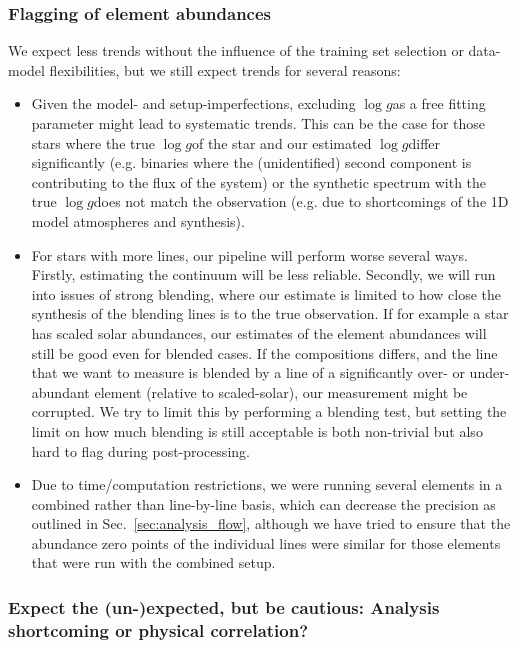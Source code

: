 \documentclass[fleqn,usenatbib,useAMS]{mnras}
\newcommand{\logg}{$\log g$}
\begin{document}
\subsubsection{Flagging of element abundances}

We expect less trends without the influence of the training set selection or data-model flexibilities, but we still expect trends for several reasons:
\begin{itemize}
\item Given the model- and setup-imperfections, excluding \logg as a free fitting parameter might lead to systematic trends. This can be the case for those stars where the true \logg of the star and our estimated \logg differ significantly (e.g. binaries where the (unidentified) second component is contributing to the flux of the system) or the synthetic spectrum with the true \logg does not match the observation (e.g. due to shortcomings of the 1D model atmospheres and synthesis).
\item For stars with more lines, our pipeline will perform worse several ways. Firstly, estimating the continuum will be less reliable. Secondly, we will run into issues of strong blending, where our estimate is limited to how close the synthesis of the blending lines is to the true observation. If for example a star has scaled solar abundances, our estimates of the element abundances will still be good even for blended cases. If the compositions differs, and the line that we want to measure is blended by a line of a significantly over- or under-abundant element (relative to scaled-solar), our measurement might be corrupted. We try to limit this by performing a blending test, but setting the limit on how much blending is still acceptable is both non-trivial but also hard to flag during post-processing.
\item Due to time/computation restrictions, we were running several elements in a combined rather than line-by-line basis, which can decrease the precision as outlined in Sec.~\ref{sec:analysis_flow}, although we have tried to ensure that the abundance zero points of the individual lines were similar for those elements that were run with the combined setup.
\end{itemize}

\subsubsection{Expect the (un-)expected, but be cautious: Analysis shortcoming or physical correlation?}
\end{document}
